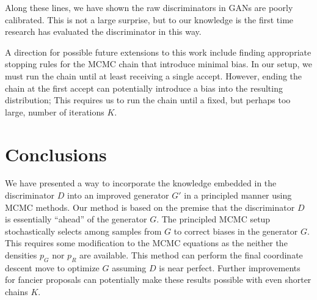 \documentclass{article}
\newcommand{\PG}{{p_G}}
\newcommand{\PR}{{p_R}}
\begin{document}
Along these lines, we have shown the raw discriminators in GANs are poorly calibrated.
This is not a large surprise, but to our knowledge is the first time research has evaluated the discriminator in this way.

A direction for possible future extensions to this work include finding appropriate stopping rules for the MCMC chain that introduce minimal bias.
In our setup, we must run the chain until at least receiving a single accept.
However, ending the chain at the first accept can potentially introduce a bias into the resulting distribution; This requires us to run the chain until a fixed, but perhaps too large, number of iterations $K$.

\section{Conclusions}


We have presented a way to incorporate the knowledge embedded in the discriminator $D$ into an improved generator $G'$ in a principled manner using MCMC methods.
Our method is based on the premise that the discriminator $D$ is essentially ``ahead'' of the generator $G$.
The principled MCMC setup stochastically selects among samples from $G$ to correct biases in the generator $G$.
This requires some modification to the MCMC equations as the neither the densities $\PG$ nor $\PR$ are available.
This method can perform the final coordinate descent move to optimize $G$ assuming $D$ is near perfect.
Further improvements for fancier proposals can potentially make these results possible with even shorter chains $K$.


\end{document}
